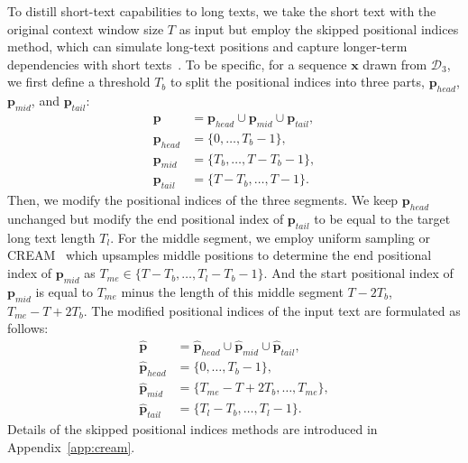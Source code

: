  To distill short-text capabilities to long texts, we take the short text with the original context window size $T$ as input but employ the skipped positional indices method, which can simulate long-text positions and capture longer-term dependencies with short texts~\cite{zhu-iclr-2024-pose,wu-nips-2024-cream}.
To be specific, for a sequence $\bm{x}$ drawn from $\mathcal{D}_3$, we first define a threshold $T_b$ to split the positional indices into three parts, \ie $\bm p_{head}$, $\bm p_{mid}$, and $\bm p_{tail}$:
\begin{align}
    \bm p  &= \bm p_{head}\cup\bm p_{mid}\cup\bm p_{tail},\\ \bm p_{head} &= \{0, \dots, T_b-1\},\\ \bm{p}_{mid} &= \{T_b, \dots, T-T_b-1\},\\\bm p_{tail} &= \{T-T_b, \dots, T-1\}.
\end{align}
Then, we modify the positional indices of the three segments. We keep $\bm p_{head}$ unchanged but modify the end positional index of $\bm p_{tail}$ to be equal to the target long text length $T_l$. For the middle segment, we employ uniform sampling or CREAM~\cite{wu-nips-2024-cream} which upsamples middle positions to determine the end positional index of $\bm p_{mid}$ as $T_{me}\in \{T-T_b,\dots,  T_l-T_b-1\}$. And the start positional index of $\bm p_{mid}$ is equal to $T_{me}$ minus the length of this middle segment $T - 2T_b$, \ie $T_{me} - T + 2T_b$. The modified positional indices of the input text are formulated as follows:
\begin{align}
    \hat{\bm{p}}  &= \hat{\bm{p}}_{head}\cup\hat{\bm{p}}_{mid}\cup\hat{\bm{p}}_{tail},\\ 
    \hat{\bm{p}}_{head} &= \{0, \dots, T_b-1\},\\
    \hat{\bm{p}}_{mid} &=\{T_{me}-T+2T_b,\dots, T_{me}\},\\
    \hat{\bm{p}}_{tail} &= \{T_l-T_b, \dots, T_l-1\}.
\end{align}
Details of the skipped positional indices methods are introduced in Appendix~\ref{app:cream}.



